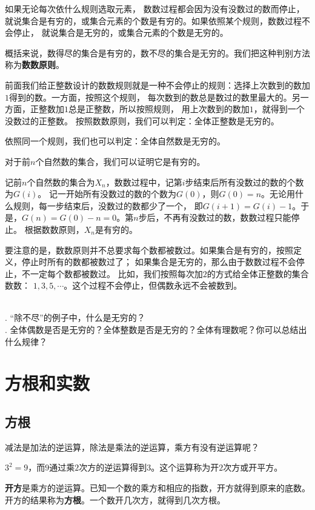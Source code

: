 \documentclass[12pt,UTF8,fontset=none]{ctexbook}
\begin{document}
如果无论每次依什么规则选取元素，
数数过程都会因为没有没数过的数而停止，就说集合是有穷的，或集合元素的个数是有穷的。如果依照某个规则，数数过程不会停止，
就说集合是无穷的，或集合元素的个数是无穷的。

概括来说，数得尽的集合是有穷的，数不尽的集合是无穷的。我们把这种判别方法称为\textbf{数数原则}。

前面我们给正整数设计的数数规则就是一种不会停止的规则：选择上次数到的数加$1$得到的数。一方面，按照这个规则，
每次数到的数总是数过的数里最大的。另一方面，正整数加$1$总是正整数，所以按照规则，
用上次数到的数加$1$，就得到一个没数过的正整数。
按照数数原则，我们可以判定：全体正整数是无穷的。

依照同一个规则，我们也可以判定：全体自然数是无穷的。

对于前$n$个自然数的集合，我们可以证明它是有穷的。

记前$n$个自然数的集合为$X_n$，数数过程中，记第$i$步结束后所有没数过的数的个数为$G(i)$。
记一开始所有没数过的数的个数为$G(0)$，则$G(0) = n$。无论用什么规则，每一步结束后，没数过的数都少了一个，
即$G(i+1) = G(i) - 1$。于是，$G(n) = G(0) - n = 0$。第$n$步后，不再有没数过的数，数数过程只能停止。
根据数数原则，$X_n$是有穷的。

要注意的是，数数原则并不总要求每个数都被数过。如果集合是有穷的，按照定义，停止时所有的数都被数过了；
如果集合是无穷的，那么由于数数过程不会停止，不一定每个数都被数过。
比如，我们按照每次加$2$的方式给全体正整数的集合数数：
$1,3,5,\cdots$。这个过程不会停止，但偶数永远不会被数到。

\begin{sk}
    \mbox{}\\
    . “除不尽”的例子中，什么是无穷的？\\
    . 全体偶数是否是无穷的？全体整数是否是无穷的？全体有理数呢？你可以总结出什么规律？
\end{sk}

\chapter{方根和实数}

\section{方根}
减法是加法的逆运算，除法是乘法的逆运算，乘方有没有逆运算呢？

$3^2 = 9$，而$9$通过乘$2$次方的逆运算得到$3$。这个运算称为开$2$次方或开平方。

\textbf{开方}是乘方的逆运算。已知一个数的乘方和相应的指数，开方就得到原来的底数。
开方的结果称为\textbf{方根}。一个数开几次方，就得到几次方根。
\end{document}
